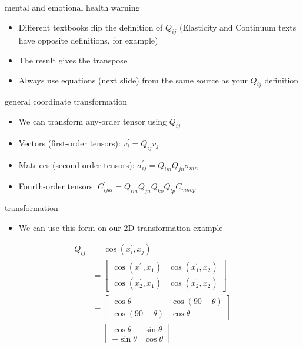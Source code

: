 \documentclass[
  letterpaper,
  ignorenonframetext,
  aspectratio=43,
  handout,
  12pt]{beamer}
\providecommand{\tightlist}{%
  \setlength{\itemsep}{0pt}\setlength{\parskip}{0pt}}
\providecommand{\tightlist}{%
\setlength{\itemsep}{0pt}\setlength{\parskip}{0pt}}
\begin{document}
\begin{frame}{mental and emotional health warning}
\protect\hypertarget{mental-and-emotional-health-warning}{}
\begin{itemize}
\tightlist
\item
  Different textbooks flip the definition of \(Q_{ij}\) (Elasticity and
  Continuum texts have opposite definitions, for example)
\item
  The result gives the transpose
\item
  Always use equations (next slide) from the same source as your
  \(Q_{ij}\) definition
\end{itemize}
\end{frame}

\begin{frame}{general coordinate transformation}
\protect\hypertarget{general-coordinate-transformation-1}{}
\begin{itemize}
\tightlist
\item
  We can transform any-order tensor using \(Q_{ij}\)
\item
  Vectors (first-order tensors): \(v_i^\prime = Q_{ij} v_j\)
\item
  Matrices (second-order tensors):
  \(\sigma_{ij}^\prime = Q_{im}Q_{jn} \sigma_{mn}\)
\item
  Fourth-order tensors:
  \(C_{ijkl}^\prime = Q_{im}Q_{jn}Q_{ko}Q_{lp} C_{mnop}\)
\end{itemize}
\end{frame}

\begin{frame}{transformation}
\protect\hypertarget{transformation-1}{}
\begin{itemize}
\tightlist
\item
  We can use this form on our 2D transformation example
\end{itemize}

\[\begin{aligned}
  Q_{ij} &= \cos (x_i^\prime, x_j)\\
&=
  \begin{bmatrix}
  \cos (x_1^\prime, x_1) & \cos (x_1^\prime, x_2)\\
  \cos (x_2^\prime, x_1) & \cos (x_2^\prime, x_2)
  \end{bmatrix}\\
  &= \begin{bmatrix}
  \cos \theta & \cos (90-\theta)\\
  \cos (90+\theta) & \cos \theta
  \end{bmatrix} \\
  &= \begin{bmatrix}
  \cos \theta & \sin \theta \\
  -\sin \theta & \cos \theta
  \end{bmatrix}
\end{aligned}\]
\end{frame}
\end{document}
